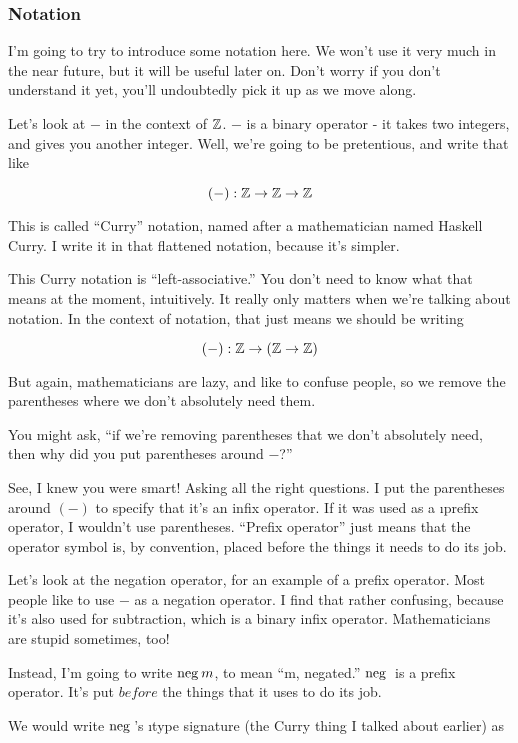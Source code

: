 \subsubsection{Notation}

I'm going to try to introduce some notation here. We won't use it very much in
the near future, but it will be useful later on. Don't worry if you don't
understand it yet, you'll undoubtedly pick it up as we move along.

Let's look at $-$ in the context of $\mathbb{Z}$. $-$ is a binary operator - it takes two
integers, and gives you another integer. Well, we're going to be pretentious,
and write that like 

\[ (-) : \mathbb{Z} \to \mathbb{Z} \to \mathbb{Z} \]

This is called ``Curry'' notation, named after a mathematician named Haskell
Curry. I write it in that flattened notation, because it's simpler. 

This Curry notation is ``left-associative.'' You don't need to know what that
means at the moment, intuitively. It really only matters when we're talking
about notation.  In the context of notation, that just means we should be
writing

\[ (-) : \mathbb{Z} \to (\mathbb{Z} \to \mathbb{Z}) \]

But again, mathematicians are lazy, and like to confuse people, so we remove the
parentheses where we don't absolutely need them.

You might ask, ``if we're removing parentheses that we don't absolutely need,
then why did you put parentheses around $-$?'' 

See, I knew you were smart! Asking all the right questions. I put the
parentheses around $(-)$ to specify that it's an infix operator. If it was used
as a \i{prefix} operator, I wouldn't use parentheses. ``Prefix operator'' just
means that the operator symbol is, by convention, placed before the things it
needs to do its job.

Let's look at the negation operator, for an example of a prefix operator. Most
people like to use $-$  as a negation operator. I find that rather confusing,
because it's also used for subtraction, which is a binary infix
operator. Mathematicians are stupid sometimes, too!

Instead, I'm going to write $\mathrm{neg}\hspace{2pt} m$, to mean ``m, negated.'' $\mathrm{neg}\hspace{2pt}$ is a prefix
operator. It's put $before$ the things that it uses to do its job.

We would write $\mathrm{neg}\hspace{2pt}$'s \i{type signature} (the Curry thing I talked about
earlier) as 

